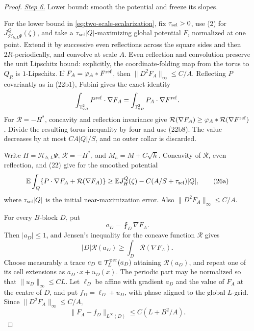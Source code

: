 \documentclass{smfart}
\theoremstyle{definition}
\newcommand{\1}{\mathbf 1}
\begin{document}
\begin{proof}
\smallskip\noindent
\underline{\textit{Step 6.}} Lower bound: smooth the potential and freeze its slopes.

For the lower bound in \eqref{eq:two-scale-scalarization}, fix
$\tau_{\rm sel}>0$, use (2) for
$J_ {\mathcal H_ {h,L}\Psi}^Q(\zeta)$, and take a
$\tau_{\rm sel}|Q|$-maximizing global potential $F$, normalized at one point.
Extend it by successive even
reflections across the square sides and then $2R$-periodically, and
convolve at scale $A$.  Even reflection and convolution preserve the
unit Lipschitz bound: explicitly, the coordinate-folding map from the
torus to $Q_ R$ is $1$-Lipschitz.  If
$F_ A=\varphi_ A*F^{\rm ref}$, then
$\|D^2F_ A\|_ \infty\leq C/A$.  Reflecting $P$ covariantly as in
(22b1), Fubini gives the exact identity
\begin{equation*}
\int_ {\mathbb T_ {2R}^2}P^{\rm ref}\cdot\nabla F_ A
=\int_ {\mathbb T_ {2R}^2}P_ A\cdot\nabla F^{\rm ref}.
\end{equation*}
For $\mathcal R=-H^*$, concavity and reflection invariance give
$\mathcal R(\nabla F_ A)\geq\varphi_ A*\mathcal R(\nabla F^{\rm ref})$.  Divide the
resulting torus inequality by four and use (22b8).  The value decreases
by at most $CA|Q|/S$, and no outer collar is discarded.

Write $H=\mathcal H_ {h,L}\Psi$, $\mathcal R=-H^*$, and
$M_ h=M+C\sqrt h$.  Concavity of $\mathcal R$, even reflection, and (22) give
for the smoothed potential
\begin{equation}
\mathbb E\int_ Q\{P\cdot\nabla F_ A+\mathcal R(\nabla F_ A)\}
\geq\mathbb EJ_ H^Q(\zeta)-C(A/S+\tau_{\rm sel})|Q|,
\tag{26a}
\end{equation}
where $\tau_{\rm sel}|Q|$ is the initial near-maximization error.  Also
$\|D^2F_ A\|_ \infty\leq C/A$.

For every $B$-block $D$, put
\begin{equation*}
a_ D=\fint_ D\nabla F_ A.
\end{equation*}
Then $|a_ D|\leq1$, and Jensen's inequality for the concave function
$\mathcal R$ gives
\begin{equation}
|D|\mathcal R(a_ D)\geq\int_ D \mathcal R(\nabla F_ A).
\tag{26b}
\end{equation}
Choose measurably a trace $c_ D\in\mathcal T_ L^{\rm per}(a_ D)$
attaining $\mathcal R(a_ D)$, and repeat one of its cell extensions as
$a_ D\cdot x+u_ D(x)$.  The periodic part may be normalized so that
$\|u_ D\|_ \infty\leq CL$.  Let $\ell_ D$ be affine with gradient
$a_ D$ and the value of $F_ A$ at the centre of $D$, and put
$f_ D=\ell_ D+u_ D$, with phase aligned to the global $L$-grid.
Since $\|D^2F_ A\|_ \infty\leq C/A$,
\begin{equation}
\|F_ A-f_ D\|_ {L^\infty(D)}\leq C(L+B^2/A).
\tag{26c}
\end{equation}


\end{proof}
\end{document}
